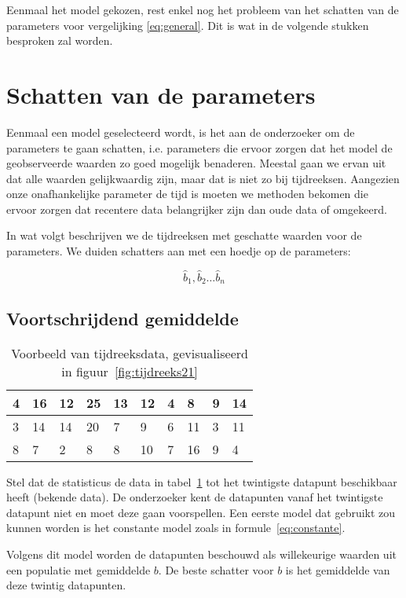 Eenmaal het model gekozen, rest enkel nog het  probleem van het schatten van de parameters voor vergelijking \ref{eq:general}. Dit is wat in de volgende stukken besproken zal worden.

\section{Schatten van de parameters}

Eenmaal een model geselecteerd wordt, is het aan de onderzoeker om de parameters te gaan schatten, i.e. parameters die ervoor zorgen dat het model de geobserveerde waarden zo goed mogelijk benaderen. Meestal gaan we ervan uit dat alle waarden gelijkwaardig zijn, maar dat is niet zo bij tijdreeksen. Aangezien onze onafhankelijke parameter de tijd is moeten we methoden bekomen die ervoor zorgen dat recentere data belangrijker zijn dan oude data of omgekeerd. 

In wat volgt beschrijven we de tijdreeksen met geschatte waarden voor de parameters. We duiden schatters aan met een hoedje op de parameters:

\[ \widehat{b}_{1}, \widehat{b}_{2} \dots \widehat{b}_{n} \] 

\subsection{Voortschrijdend gemiddelde}

\begin{table}
\centering
\begin{tabular}{|l|l|l|l|l|l|l|l|l|l|}
  \hline
  4 & 16 & 12 & 25 & 13 & 12 & 4 & 8  & 9 & 14 \\ \hline
  3 & 14 & 14 & 20 & 7  & 9  & 6 & 11 & 3 & 11 \\ \hline
  8 & 7  & 2  & 8  & 8  & 10 & 7 & 16 & 9 & 4  \\ \hline
\end{tabular}
\caption{Voorbeeld van tijdreeksdata, gevisualiseerd in figuur~\ref{fig:tijdreeks21}}
\label{tab:data-tijdreeks21}
\end{table}

Stel dat de statisticus de data in tabel~\ref{tab:data-tijdreeks21} tot het twintigste datapunt beschikbaar heeft (bekende data). De onderzoeker kent de datapunten vanaf het twintigste datapunt niet en moet deze gaan voorspellen. Een eerste model dat gebruikt zou kunnen worden is het constante model zoals in formule~\ref{eq:constante}. 

Volgens dit model worden de datapunten beschouwd als willekeurige waarden uit een populatie met gemiddelde $b$. De beste schatter voor $b$ is het gemiddelde van deze twintig datapunten. 

